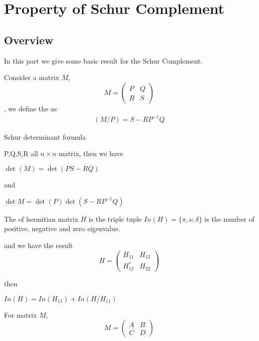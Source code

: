 
\chapter{Property of Schur Complement}
\section*{Overview}



In this part we give some basic result for the Schur Complement.

Consider a matrix $M$,
$$
M=\left(\begin{array}{cc}
  P & Q \\
  R & S
  \end{array}\right)
$$
,
we define the 
 as 
\begin{align}
  (M/P) = S - RP^{-1 }Q
\end{align}

\begin{lemma}
  Schur determinant formula


  P,Q,S,R all $n \times n$ matrix, then we have

  $\det(M) = \det(PS - RQ)$

  and

  $\det M = \det(P) \det(S-RP^{-1}Q)$
\end{lemma}

\begin{definition}
  The  of hermitian matrix $H$ is the triple tuple
  $In(H)= \{\pi,\nu,\delta\}$ is the number of positive, negative and zero eigenvalue.
\end{definition}

and we have the result
$$
H=\left(\begin{array}{cc}
  H_{11} & H_{12} \\
  H_{12}^* & H_{22}
  \end{array}\right)
$$

then

$In(H) = In(H_{11}) + In(H/H_{11})$

For matrix $M$,
$$
M=\left(\begin{array}{cc}
  A & B \\
  C & D
  \end{array}\right)
$$

